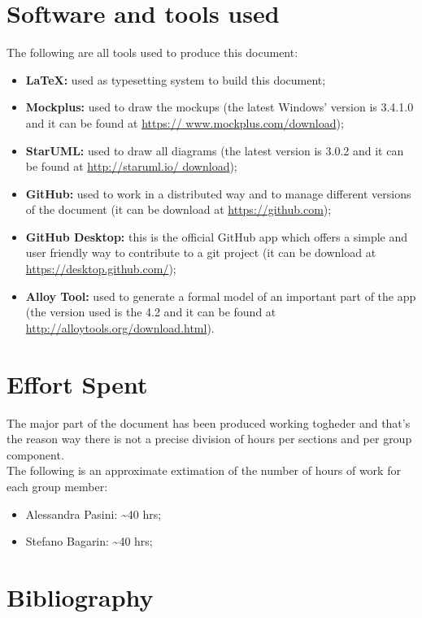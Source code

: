 \section{Software and tools used}
The following are all tools used to produce this document:
\begin{itemize}
	\item \textbf{\LaTeX:} used as typesetting system to build this document;
	\item \textbf{Mockplus:} used to draw the mockups (the latest Windows' version is 3.4.1.0 and it can be found at \url{https://			www.mockplus.com/download});
	\item \textbf{StarUML:} used to draw all diagrams (the latest version is 3.0.2 and it can be found at \url{http://staruml.io/			download});
	\item \textbf{GitHub:} used to work in a distributed way and to manage different versions of the document (it can be download at		\url{https://github.com});
	\item \textbf{GitHub Desktop:} this is the official GitHub app which offers a simple and user friendly way to contribute to a git 			project (it can be download at \url{https://desktop.github.com/});
	\item \textbf{Alloy Tool:} used to generate a formal model of an important part of the app (the version used is the 4.2 and it 		can be found at \url{http://alloytools.org/download.html}).
\end{itemize}

\section{Effort Spent}
The major part of the document has been produced working togheder and that's the reason way there is not a precise division of hours per sections and per group component.\\
The following is an approximate extimation of the number of hours of work for each group member:
\begin{itemize}
\item Alessandra Pasini: \textasciitilde 40 hrs;
\item Stefano Bagarin: \textasciitilde 40 hrs;
\end{itemize}

\section{Bibliography}

